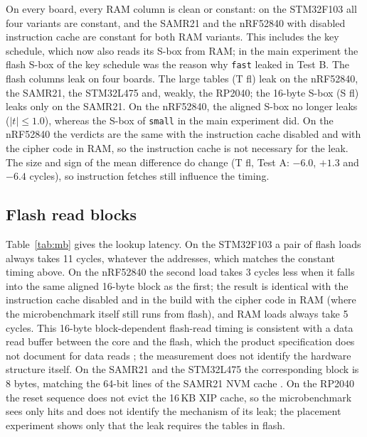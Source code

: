 \documentclass[11pt, a4paper, twoside, reqno]{article}
\newcommand{\tsm}{\texttt{small}}
\newcommand{\tfa}{\texttt{fast}}
\begin{document}
On every board, every RAM column is clean or constant: on the STM32F103 all four variants are constant, and the SAMR21 and the nRF52840 with disabled instruction cache are constant for both RAM variants. This includes the key schedule, which now also reads its S-box from RAM; in the main experiment the flash S-box of the key schedule was the reason why \tfa{} leaked in Test B. The flash columns leak on four boards. The large tables (T fl) leak on the nRF52840, the SAMR21, the STM32L475 and, weakly, the RP2040; the 16-byte S-box (S fl) leaks only on the SAMR21. On the nRF52840, the aligned S-box no longer leaks ($|t|\leq1.0$), whereas the S-box of \tsm{} in the main experiment did. On the nRF52840 the verdicts are the same with the instruction cache disabled and with the cipher code in RAM, so the instruction cache is not necessary for the leak. The size and sign of the mean difference do change (T fl, Test A: $-6.0$, $+1.3$ and $-6.4$ cycles), so instruction fetches still influence the timing.

\subsection{Flash read blocks}

Table~\ref{tab:mb} gives the lookup latency. On the STM32F103 a pair of flash loads always takes 11 cycles, whatever the addresses, which matches the constant timing above. On the nRF52840 the second load takes 3 cycles less when it falls into the same aligned 16-byte block as the first; the result is identical with the instruction cache disabled and in the build with the cipher code in RAM (where the microbenchmark itself still runs from flash), and RAM loads always take 5 cycles. This 16-byte block-dependent flash-read timing is consistent with a data read buffer between the core and the flash, which the product specification does not document for data reads \citep{nrf52840}; the measurement does not identify the hardware structure itself. On the SAMR21 and the STM32L475 the corresponding block is 8 bytes, matching the 64-bit lines of the SAMR21 NVM cache \citep{samr21}. On the RP2040 the reset sequence does not evict the 16\,KB XIP cache, so the microbenchmark sees only hits and does not identify the mechanism of its leak; the placement experiment shows only that the leak requires the tables in flash.

\begin{table}[!htbp]
\centering
\caption{Lookup microbenchmark: time of two consecutive byte loads (cycles, including timer overhead) when the second address lies in the same aligned block as the first or in another block; the microbenchmark code runs from flash in all builds; identical on both nodes of every type; where a block was found, the 32$\times$32 address-pair matrix agreed with it in all 1\,024 cells.}
\label{tab:mb}
\footnotesize

\end{table}
\end{document}
